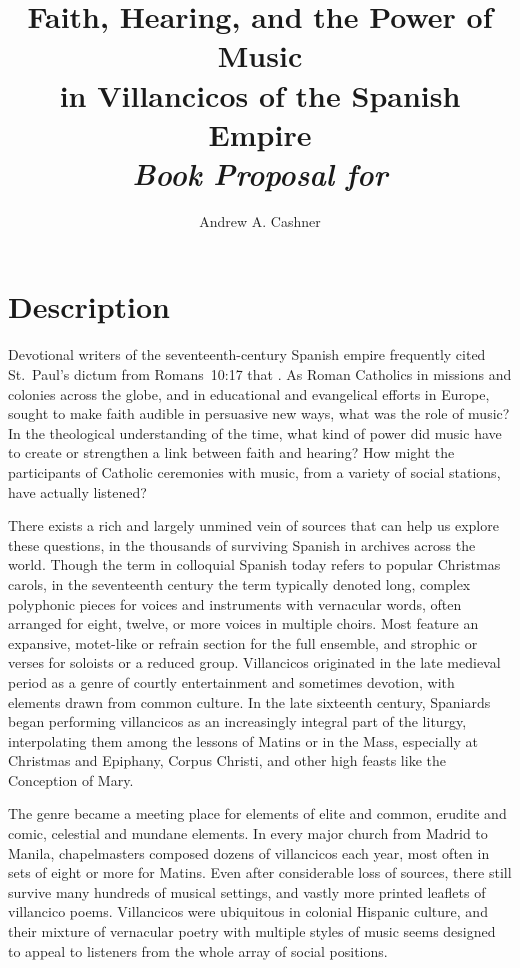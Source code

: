 \documentclass{vcbook-proposal}
\title    {Faith, Hearing, and the Power of Music\\
           in Villancicos of the Spanish Empire\\
           \emph{Book Proposal for \publisher}}
\author   {Andrew A. Cashner}
\begin{document}
\maketitle

\tableofcontents
\clearpage

\section{Description}

Devotional writers of the seventeenth-century Spanish empire frequently cited 
St.~Paul's dictum from Romans~10:17 that .
As Roman Catholics in missions and colonies across the globe, and in 
educational and evangelical efforts in Europe, sought to make faith audible in 
persuasive new ways, what was the role of music?
In the theological understanding of the time, what kind of power did music have 
to create or strengthen a link between faith and hearing?
How might the participants of Catholic ceremonies with music, from a variety of 
social stations, have actually listened?

There exists a rich and largely unmined vein of sources that can help us 
explore these questions, in the thousands of surviving Spanish 
 in archives across the world.
Though the term  in colloquial Spanish today refers to popular
Christmas carols, in the seventeenth century the term typically denoted long,
complex polyphonic pieces for voices and instruments with vernacular words,
often arranged for eight, twelve, or more voices in multiple choirs.
Most feature an expansive, motet-like  or refrain section for 
the full ensemble, and strophic  or verses for soloists or a 
reduced group.
Villancicos originated in the late medieval period as a genre of courtly 
entertainment and sometimes devotion, with elements drawn from common culture.
In the late sixteenth century, Spaniards began performing villancicos as an 
increasingly integral part of the liturgy, interpolating them among the lessons 
of Matins or in the Mass, especially at Christmas and Epiphany, Corpus Christi, 
and other high feasts like the Conception of Mary.

The genre became a meeting place for elements of elite and common, erudite and 
comic, celestial and mundane elements.
In every major church from Madrid to Manila, chapelmasters composed dozens of
villancicos each year, most often in sets of eight or more for Matins.
Even after considerable loss of sources, there still survive many hundreds of 
musical settings, and vastly more printed leaflets of villancico poems. 
Villancicos were ubiquitous in colonial Hispanic culture, and their mixture of 
vernacular poetry with multiple styles of music seems designed to appeal to 
listeners from the whole array of social positions.
\end{document}
